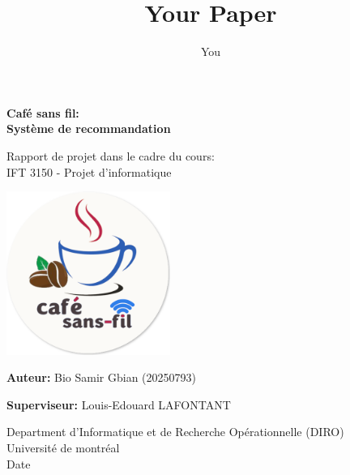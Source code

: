 \documentclass[11pt]{article}
\title{Your Paper}
\author{You}
\begin{document}
\setlength\parindent{0pt}

\begin{titlepage}
    \begin{center}
        \vspace*{1cm}
            
        \Huge
        \textbf{Café sans fil: \\Système de recommandation}
            
        \vspace{0.5cm}
        \LARGE
        Rapport de projet dans le cadre du cours: \\IFT 3150 - Projet d'informatique

        \vspace{3cm}
        
        \includegraphics[width=0.4\textwidth]{image_cafe.png}

        \vspace{2cm}
            
        \textbf{Auteur:} Bio Samir Gbian (20250793)

        \vspace{0.5cm}

        \textbf{Superviseur:} Louis-Edouard LAFONTANT
            
        \vfill
                    
        \Large
        Department d'Informatique et de Recherche Opérationnelle (DIRO)\\
        Université de montréal\\
        Date
            
    \end{center}
\end{titlepage}

\tableofcontents

\newpage
\listoffigures

\newpage
\end{document}

